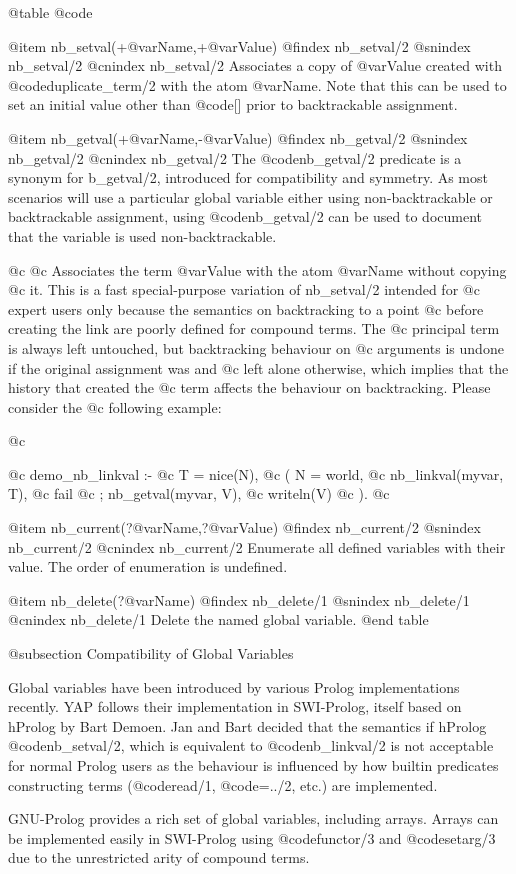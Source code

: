 @table @code

@item nb_setval(+@var{Name},+@var{Value})
@findex nb_setval/2
@snindex nb_setval/2
@cnindex nb_setval/2
Associates a copy of @var{Value} created with @code{duplicate_term/2}
with the atom @var{Name}.  Note that this can be used to set an
initial value other than @code{[]} prior to backtrackable assignment.

@item nb_getval(+@var{Name},-@var{Value})
@findex nb_getval/2
@snindex nb_getval/2
@cnindex nb_getval/2
The @code{nb_getval/2} predicate is a synonym for b_getval/2, introduced for
compatibility and symmetry.  As most scenarios will use a particular
global variable either using non-backtrackable or backtrackable
assignment, using @code{nb_getval/2} can be used to document that the 
variable is used non-backtrackable.

@c     
@c Associates the term @var{Value} with the atom @var{Name} without copying
@c it. This is a fast special-purpose variation of nb_setval/2 intended for
@c expert users only because the semantics on backtracking to a point
@c before creating the link are poorly defined for compound terms. The
@c principal term is always left untouched, but backtracking behaviour on
@c arguments is undone if the original assignment was  and
@c left alone otherwise, which implies that the history that created the
@c term affects the behaviour on backtracking. Please consider the
@c following example:

@c \begin{code}
@c demo_nb_linkval :-
@c 	T = nice(N),
@c 	(   N = world,
@c 	    nb_linkval(myvar, T),
@c 	    fail
@c 	;   nb_getval(myvar, V),
@c 	    writeln(V)
@c 	).
@c \end{code}

@item nb_current(?@var{Name},?@var{Value})
@findex nb_current/2
@snindex nb_current/2
@cnindex nb_current/2
Enumerate all defined variables with their value. The order of
enumeration is undefined.

@item nb_delete(?@var{Name})
@findex nb_delete/1
@snindex nb_delete/1
@cnindex nb_delete/1
Delete the named global variable.
@end table

@subsection Compatibility of Global Variables

Global variables have been introduced by various Prolog
implementations recently.  YAP follows their implementation in SWI-Prolog, itself
based on hProlog by Bart Demoen. Jan and Bart
decided that the semantics if hProlog @code{nb_setval/2}, which is
equivalent to @code{nb_linkval/2} is not acceptable for normal Prolog
users as the behaviour is influenced by how builtin predicates
constructing terms (@code{read/1}, @code{=../2}, etc.) are implemented.

GNU-Prolog provides a rich set of global variables, including arrays.
Arrays can be implemented easily in SWI-Prolog using @code{functor/3} and
@code{setarg/3} due to the unrestricted arity of compound terms.


